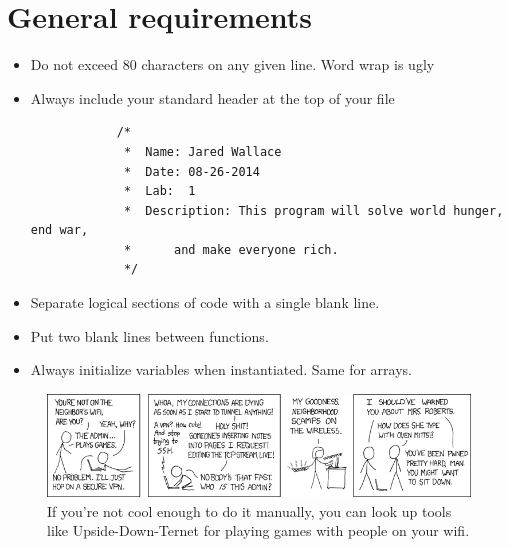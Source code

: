 \documentclass[letterpaper,12pt]{article}
\begin{document}
\section*{General requirements}
\begin{itemize}
    \item Do not exceed 80 characters on any given line. Word wrap is ugly
    \item Always include your standard header at the top of your file
        \begin{lstlisting}
            /*
             *  Name: Jared Wallace
             *  Date: 08-26-2014
             *  Lab:  1
             *  Description: This program will solve world hunger, end war,
             *      and make everyone rich.
             */
        \end{lstlisting}
    \item Separate logical sections of code with a single blank line.
    \item Put two blank lines between functions.
    \item Always initialize variables when instantiated. Same for arrays.
\end{itemize}
\begin{figure}[ht!]
	\centering
	\includegraphics[width=5in]{1337_part_1.png}
    \caption*{If you're not cool enough to do it manually, you can look up tools like Upside-Down-Ternet for playing games with people on your wifi.}
\end{figure}
\end{document}
